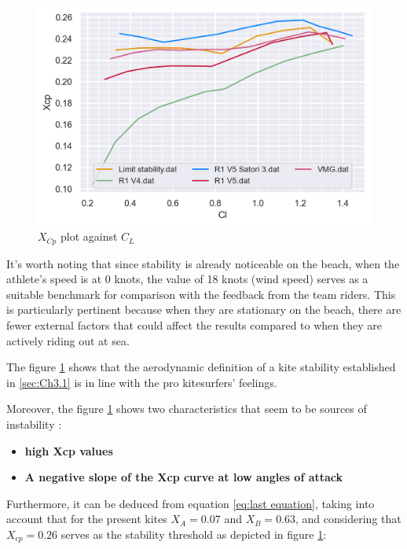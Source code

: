 \begin{figure}[H]
    \centering
    \includegraphics[width=1.0\textwidth]{figures/Stability/airfoils stability.png}
    \caption{$X_{Cp}$ plot against $C_{L}$ }
    \label{fig:X_{Cp} plot against C_{L}}
\end{figure}

It's worth noting that since stability is already noticeable on the beach, when the athlete's speed is at 0 knots, the value of 18 knots (wind speed) serves as a suitable benchmark for comparison with the feedback from the team riders. This is particularly pertinent because when they are stationary on the beach, there are fewer external factors that could affect the results compared to when they are actively riding out at sea.

The figure \ref{fig:X_{Cp} plot against C_{L}} shows that the aerodynamic definition of a kite stability established in \ref{sec:Ch3.1} is in line with the pro kitesurfers' feelings. 

Moreover, the figure \ref{fig:X_{Cp} plot against C_{L}} shows two characteristics that seem to be sources of instability : 
\begin{itemize}
    \item \textbf{high Xcp values}
    \item \textbf{A negative slope of the Xcp curve at low angles of attack}
\end{itemize}

Furthermore, it can be deduced from equation \ref{eq:last equation}, taking into account that for the present kites $X_{A} = 0.07$ and $X_{B} = 0.63$, and considering that $X_{cp} = 0.26$ serves as the stability threshold as depicted in figure \ref{fig:X_{Cp} plot against C_{L}}: \\

